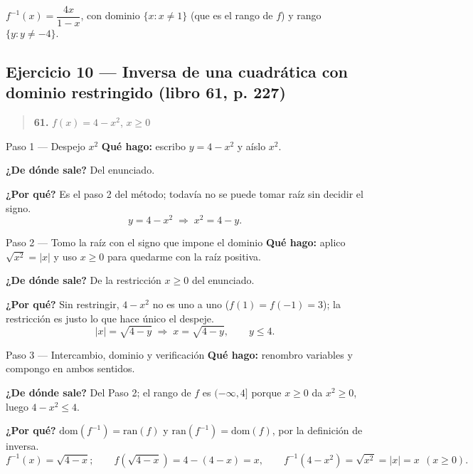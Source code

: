 \documentclass[11pt]{article}
\begin{document}
\begin{resp}
$f^{-1}(x)=\dfrac{4x}{1-x}$, con dominio $\{x: x\neq 1\}$ (que es el rango de $f$) y rango $\{y: y\neq -4\}$.
\end{resp}

\subsection*{Ejercicio 10 --- Inversa de una cuadrática con dominio restringido (libro 61, p. 227)}

\begin{quote}
\textbf{61.} $f(x)=4-x^2$, \quad $x\ge 0$
\end{quote}

\begin{paso}{Paso 1 --- Despejo $x^2$}
\textbf{Qué hago:} escribo $y=4-x^2$ y aíslo $x^2$.

\textbf{¿De dónde sale?} Del enunciado.

\textbf{¿Por qué?} Es el paso 2 del método; todavía no se puede tomar raíz sin decidir el signo.
\[
y=4-x^2 \;\Longrightarrow\; x^2=4-y.
\]
\end{paso}

\begin{paso}{Paso 2 --- Tomo la raíz con el signo que impone el dominio}
\textbf{Qué hago:} aplico $\sqrt{x^2}=|x|$ y uso $x\ge 0$ para quedarme con la raíz positiva.

\textbf{¿De dónde sale?} De la restricción $x\ge 0$ del enunciado.

\textbf{¿Por qué?} Sin restringir, $4-x^2$ no es uno a uno ($f(1)=f(-1)=3$); la restricción es justo lo que hace único el despeje.
\[
|x|=\sqrt{4-y} \;\Longrightarrow\; x=\sqrt{4-y}, \qquad y\le 4.
\]
\end{paso}

\begin{paso}{Paso 3 --- Intercambio, dominio y verificación}
\textbf{Qué hago:} renombro variables y compongo en ambos sentidos.

\textbf{¿De dónde sale?} Del Paso 2; el rango de $f$ es $(-\infty,4]$ porque $x\ge 0$ da $x^2\ge 0$, luego $4-x^2\le 4$.

\textbf{¿Por qué?} $\text{dom}(f^{-1})=\text{ran}(f)$ y $\text{ran}(f^{-1})=\text{dom}(f)$, por la definición de inversa.
\[
f^{-1}(x)=\sqrt{4-x};\qquad
f\!\left(\sqrt{4-x}\right)=4-(4-x)=x,\qquad
f^{-1}\!\left(4-x^2\right)=\sqrt{x^2}=|x|=x \ \ (x\ge 0).
\]
\end{paso}
\end{document}
